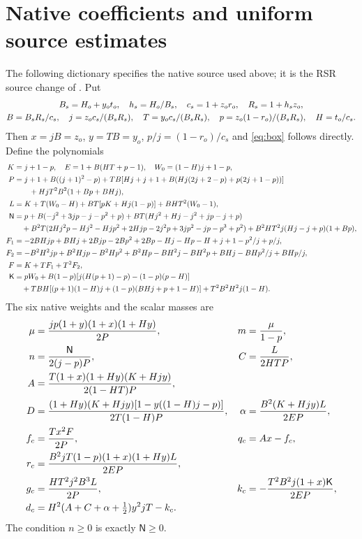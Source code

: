 \documentclass[10pt]{article}
\newcommand{\half}{\tfrac12}
\begin{document}
\section{Native coefficients and uniform source estimates}\label{app:source}
The following dictionary specifies the native source used above; it is the
RSR source change of \cite{companion}. Put
\begin{gather}
 B_s=H_o+y_ot_o,\quad h_s=H_o/B_s,\quad c_s=1+z_or_o,\quad
 R_s=1+h_sz_o,\notag\\
 B=B_sR_s/c_s,\quad j=z_oc_s/(B_sR_s),\quad
 T=y_oc_s/(B_sR_s),\quad
 p=z_o(1-r_o)/(B_sR_s),\quad H=t_o/c_s.
 \label{eq:sourcechange}
\end{gather}
Then $x=jB=z_o$, $y=TB=y_o$, $p/j=(1-r_o)/c_s$ and
\eqref{eq:box} follows directly. Define the polynomials
\begin{align}
 K&=j+1-p,\quad E=1+B(HT+p-1),\quad W_0=(1-H)j+1-p,\notag\\
 P&=j+1+B((j+1)^2-p)
 +TB[Hj+j+1+B(Hj(2j+2-p)+p(2j+1-p))]\notag\\
 &\hspace{2em}+HjT^2B^2(1+Bp+BHj),\notag\\
 L&=K+T(W_0-H)+BT[pK+Hj(1-p)]+BHT^2(W_0-1),\notag\\
 \mathsf N&=p+B(-j^2+3jp-j-p^2+p)+BT(Hj^2+Hj-j^2+jp-j+p)\notag\\
 &\quad+B^2T(2Hj^2p-Hj^2-Hjp^2+2Hjp-2j^2p+3jp^2-jp-p^3+p^2)
       +B^2HT^2j(Hj-j+p)(1+Bp),\notag\\
 F_1&=-2BHjp+BHj+2Bjp-2Bp^2+2Bp-Hj-Hp-H+j+1-p^2/j+p/j,\notag\\
 F_2&=-B^2H^2jp+B^2Hjp-B^2Hp^2+B^2Hp-BH^2j-BH^2p
                 +BHj-BHp^2/j+BHp/j,\notag\\
 F&=K+TF_1+T^2F_2,\notag\\
 \mathsf K&=pW_0+B(1-p)[j(H(p+1)-p)-(1-p)(p-H)]\notag\\
 &\quad+TBH[(p+1)(1-H)j+(1-p)(BHj+p+1-H)]
                    +T^2B^2H^2j(1-H).
 \label{eq:polys}
\end{align}
The six native weights and the scalar masses are
\begin{align}
 \mu&=\frac{jp(1+y)(1+x)(1+Hy)}{2P},&
 m&=\frac{\mu}{1-p},\notag\\
 n&=\frac{\mathsf N}{2(j-p)P},& C&=\frac{L}{2HTP},\notag\\
 A&=\frac{T(1+x)(1+Hy)(K+Hjy)}{2(1-HT)P},\notag\\
 D&=\frac{(1+Hy)(K+Hjy)[1-y((1-H)j-p)]}{2T(1-H)P},&
 \alpha&=\frac{B^2(K+Hjy)L}{2EP},\notag\\
 f_c&=\frac{Tx^2F}{2P},& q_c&=Ax-f_c,\notag\\
 r_c&=\frac{B^2jT(1-p)(1+x)(1+Hy)L}{2EP},\notag\\
 g_c&=\frac{HT^2j^2B^3L}{2P},&
 k_c&=-\frac{T^2B^2j(1+x)\mathsf K}{2EP},\notag\\
 d_c&=H^2(A+C+\alpha+\half)y^2jT-k_c.
 \label{eq:source}
\end{align}
The condition $n\geq0$ is exactly $\mathsf N\geq0$.
\end{document}

